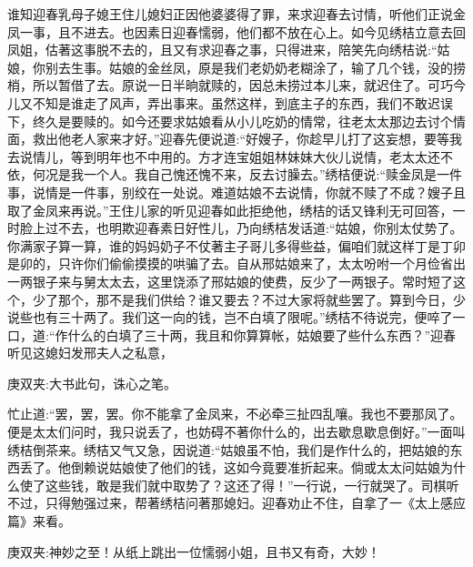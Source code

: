 \begin{parag}
    谁知迎春乳母子媳王住儿媳妇正因他婆婆得了罪，来求迎春去讨情，听他们正说金凤一事，且不进去。也因素日迎春懦弱，他们都不放在心上。如今见绣桔立意去回凤姐，估著这事脱不去的，且又有求迎春之事，只得进来，陪笑先向绣桔说:“姑娘，你别去生事。姑娘的金丝凤，原是我们老奶奶老糊涂了，输了几个钱，没的捞梢，所以暂借了去。原说一日半晌就赎的，因总未捞过本儿来，就迟住了。可巧今儿又不知是谁走了风声，弄出事来。虽然这样，到底主子的东西，我们不敢迟误下，终久是要赎的。如今还要求姑娘看从小儿吃奶的情常，往老太太那边去讨个情面，救出他老人家来才好。”迎春先便说道:“好嫂子，你趁早儿打了这妄想，要等我去说情儿，等到明年也不中用的。方才连宝姐姐林妹妹大伙儿说情，老太太还不依，何况是我一个人。我自己愧还愧不来，反去讨臊去。”绣桔便说:“赎金凤是一件事，说情是一件事，别绞在一处说。难道姑娘不去说情，你就不赎了不成？嫂子且取了金凤来再说。”王住儿家的听见迎春如此拒绝他，绣桔的话又锋利无可回答，一时脸上过不去，也明欺迎春素日好性儿，乃向绣桔发话道:“姑娘，你别太仗势了。你满家子算一算，谁的妈妈奶子不仗著主子哥儿多得些益，偏咱们就这样丁是丁卯是卯的，只许你们偷偷摸摸的哄骗了去。自从邢姑娘来了，太太吩咐一个月俭省出一两银子来与舅太太去，这里饶添了邢姑娘的使费，反少了一两银子。常时短了这个，少了那个，那不是我们供给？谁又要去？不过大家将就些罢了。算到今日，少说些也有三十两了。我们这一向的钱，岂不白填了限呢。”绣桔不待说完，便啐了一口，道:“作什么的白填了三十两，我且和你算算帐，姑娘要了些什么东西？”迎春听见这媳妇发邢夫人之私意，\begin{note}庚双夹:大书此句，诛心之笔。\end{note}忙止道:“罢，罢，罢。你不能拿了金凤来，不必牵三扯四乱嚷。我也不要那凤了。便是太太们问时，我只说丢了，也妨碍不著你什么的，出去歇息歇息倒好。”一面叫绣桔倒茶来。绣桔又气又急，因说道:“姑娘虽不怕，我们是作什么的，把姑娘的东西丢了。他倒赖说姑娘使了他们的钱，这如今竟要准折起来。倘或太太问姑娘为什么使了这些钱，敢是我们就中取势了？这还了得！”一行说，一行就哭了。司棋听不过，只得勉强过来，帮著绣桔问著那媳妇。迎春劝止不住，自拿了一《太上感应篇》来看。\begin{note}庚双夹:神妙之至！从纸上跳出一位懦弱小姐，且书又有奇，大妙！\end{note}
\end{parag}



